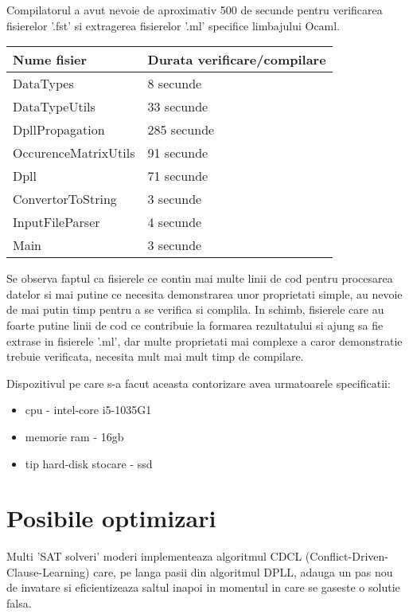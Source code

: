 {Compilatorul a avut nevoie de aproximativ 500 de secunde pentru verificarea fisierelor '.fst' si extragerea fisierelor '.ml' specifice limbajului Ocaml. 
\newline

\begin{tabular}{|l|l|} \hline
	Nume fisier & Durata verificare/compilare \\\hline
	DataTypes & 8 secunde \\\hline
	DataTypeUtils & 33 secunde \\\hline
	DpllPropagation & 285 secunde \\\hline
	OccurenceMatrixUtils & 91 secunde \\\hline
	Dpll & 71 secunde \\\hline
	ConvertorToString & 3 secunde \\\hline
	InputFileParser & 4 secunde \\\hline
	Main & 3 secunde \\\hline	
\end{tabular}
\newline\newline

Se observa faptul ca fisierele ce contin mai multe linii de cod pentru procesarea datelor si mai putine ce necesita demonstrarea unor proprietati simple, au nevoie de mai putin timp pentru a se verifica si complila. In schimb, fisierele care au foarte putine linii de cod ce contribuie la formarea rezultatului si ajung sa fie extrase in fisierele '.ml', dar multe proprietati mai complexe a caror demonstratie trebuie verificata, necesita mult mai mult timp de compilare.
\newline

Dispozitivul pe care s-a facut aceasta contorizare avea urmatoarele specificatii:
\begin{itemize}
	\item cpu - intel-core i5-1035G1
	\item memorie ram - 16gb
	\item tip hard-disk stocare - ssd
\end{itemize}



\section{Posibile optimizari}

Multi 'SAT solveri' moderi implementeaza algoritmul CDCL (Conflict-Driven-Clause-Learning) care, pe langa pasii din algoritmul DPLL, adauga un pas nou de invatare si eficientizeaza saltul inapoi in momentul in care se gaseste o solutie falsa.

}
